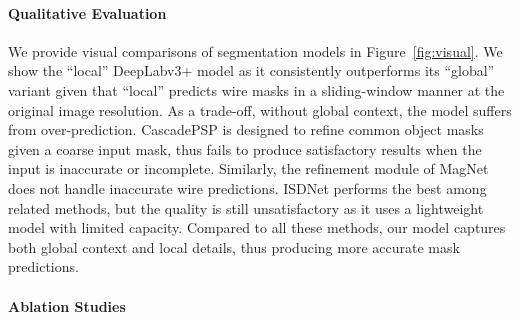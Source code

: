 


\vspace{-4.5mm}
\paragraph{Qualitative Evaluation}
We provide visual comparisons of segmentation models in Figure~\ref{fig:visual}. We show the ``local'' DeepLabv3+ model as it consistently outperforms its ``global'' variant given that ``local'' predicts wire masks in a sliding-window manner at the original image resolution. As a trade-off, without global context, the model suffers from over-prediction. CascadePSP is designed to refine common object masks given a coarse input mask, thus fails to produce satisfactory results when the input is inaccurate or incomplete. Similarly, the refinement module of MagNet does not handle inaccurate wire predictions. ISDNet performs the best among related methods, but the quality is still unsatisfactory as it uses a lightweight model with limited capacity. Compared to all these methods, our model captures both global context and local details, thus producing more accurate mask predictions.
\vspace{-4mm}
\paragraph{Ablation Studies}


